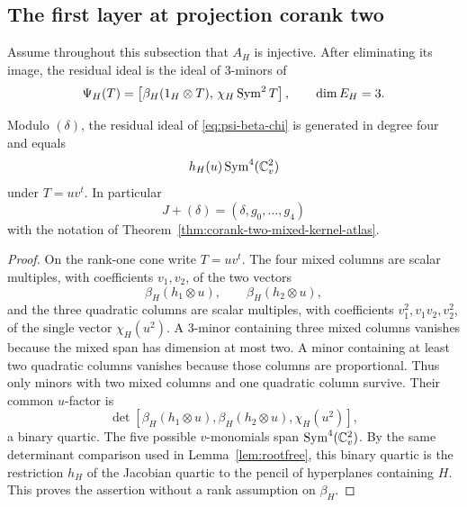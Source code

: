 \subsection{The first layer at projection corank two}

Assume throughout this subsection that \(A_H\) is injective.  After
eliminating its image, the residual ideal is the ideal of \(3\)-minors
of
\begin{equation}\label{eq:psi-beta-chi}
 \Psi_H(T)=
 \left[
   \beta_H(1_H\otimes T),\,
   \chi_H\operatorname{Sym}^2T
 \right],
 \qquad \dim E_H=3.
\end{equation}

\begin{lemma}
\label{lem:contact-symbol-all-Ainj}
Modulo \((\delta)\), the residual ideal of
\eqref{eq:psi-beta-chi} is generated in degree four and equals
\[
 h_H(u)\operatorname{Sym}^4(\mathbb C^2_v)
\]
under \(T=uv^t\).  In particular
\[
 J+(\delta)=(\delta,g_0,\ldots,g_4)
\]
with the notation of
Theorem~\ref{thm:corank-two-mixed-kernel-atlas}.
\end{lemma}

\begin{proof}
On the rank-one cone write \(T=uv^t\).  The four mixed columns are
scalar multiples, with coefficients \(v_1,v_2\), of the two vectors
\[
 \beta_H(h_1\otimes u),\qquad
 \beta_H(h_2\otimes u),
\]
and the three quadratic columns are scalar multiples, with
coefficients \(v_1^2,v_1v_2,v_2^2\), of the single vector
\(\chi_H(u^2)\).  A \(3\)-minor containing three mixed columns
vanishes because the mixed span has dimension at most two.  A minor
containing at least two quadratic columns vanishes because those
columns are proportional.  Thus only minors with two mixed columns
and one quadratic column survive.  Their common \(u\)-factor is
\[
 \det[
   \beta_H(h_1\otimes u),
   \beta_H(h_2\otimes u),
   \chi_H(u^2)
 ],
\]
a binary quartic.  The five possible \(v\)-monomials span
\(\operatorname{Sym}^4(\mathbb C^2_v)\).  By the same determinant comparison used in
Lemma~\ref{lem:rootfree}, this binary quartic is the restriction
\(h_H\) of the Jacobian quartic to the pencil of hyperplanes
containing \(H\).  This proves the assertion without a rank
assumption on \(\beta_H\).
\end{proof}

